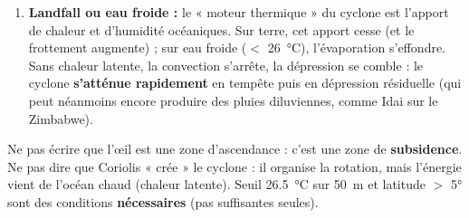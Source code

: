 \documentclass[11pt]{article}
\begin{document}
\begin{corrige}
\begin{enumerate}
    \item \textbf{Landfall ou eau froide :} le « moteur thermique » du cyclone est l'apport de chaleur et d'humidité océaniques. Sur terre, cet apport cesse (et le frottement augmente) ; sur eau froide ($<$ \SI{26}{\celsius}), l'évaporation s'effondre. Sans chaleur latente, la convection s'arrête, la dépression se comble : le cyclone \textbf{s'atténue rapidement} en tempête puis en dépression résiduelle (qui peut néanmoins encore produire des pluies diluviennes, comme Idai sur le Zimbabwe).
\end{enumerate}
\end{corrige}

\begin{attention}
Ne pas écrire que l'œil est une zone d'ascendance : c'est une zone de \textbf{subsidence}. Ne pas dire que Coriolis « crée » le cyclone : il organise la rotation, mais l'énergie vient de l'océan chaud (chaleur latente). Seuil \SI{26,5}{\celsius} sur \SI{50}{\meter} et latitude $>$ 5° sont des conditions \textbf{nécessaires} (pas suffisantes seules).
\end{attention}
\end{document}
